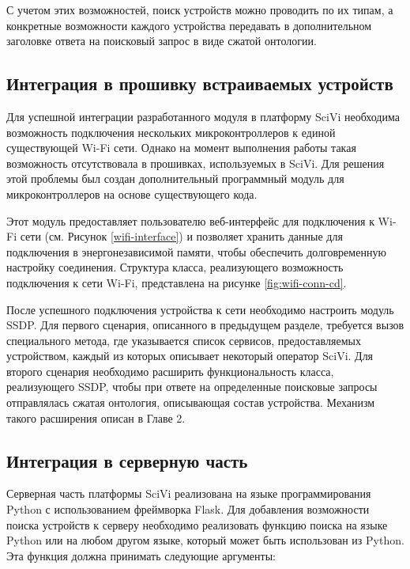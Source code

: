 С учетом этих возможностей, поиск устройств можно проводить по их типам, а конкретные возможности каждого устройства передавать в дополнительном заголовке ответа на поисковый запрос в виде сжатой онтологии.

\subsection{Интеграция в прошивку встраиваемых устройств}

Для успешной интеграции разработанного модуля в платформу SciVi необходима возможность подключения нескольких микроконтроллеров к единой существующей Wi-Fi сети.
Однако на момент выполнения работы такая возможность отсутствовала в прошивках, используемых в SciVi.
Для решения этой проблемы был создан дополнительный программный модуль для микроконтроллеров на основе существующего кода.

Этот модуль предоставляет пользователю веб-интерфейс для подключения к Wi-Fi сети (см.
Рисунок \ref{wifi-interface}) и позволяет хранить данные для подключения в энергонезависимой памяти, чтобы обеспечить долговременную настройку соединения.
Структура класса, реализующего возможность подключения к сети Wi-Fi, представлена на рисунке \ref{fig:wifi-conn-cd}.



После успешного подключения устройства к сети необходимо настроить модуль SSDP.
Для первого сценария, описанного в предыдущем разделе, требуется вызов специального метода, где указывается список сервисов, предоставляемых устройством, каждый из которых описывает некоторый оператор SciVi.
Для второго сценария необходимо расширить функциональность класса, реализующего SSDP, чтобы при ответе на определенные поисковые запросы отправлялась сжатая онтология, описывающая состав устройства.
Механизм такого расширения описан в Главе 2.

\subsection{Интеграция в серверную часть}

Серверная часть платформы SciVi реализована на языке программирования Python с использованием фреймворка Flask.
Для добавления возможности поиска устройств к серверу необходимо реализовать функцию поиска на языке Python или на любом другом языке, который может быть использован из Python.
Эта функция должна принимать следующие аргументы:

